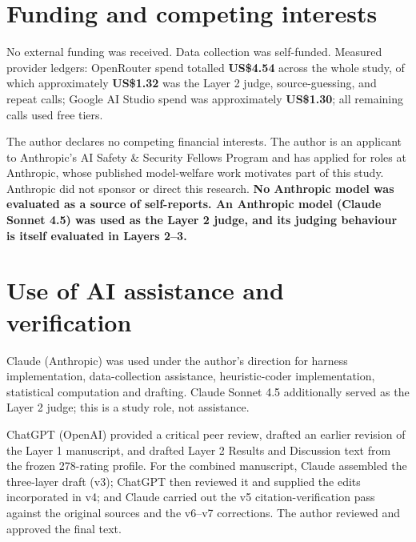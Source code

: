 \documentclass[11pt]{article}
\begin{document}
\hypertarget{funding-and-competing-interests}{%
\section*{Funding and competing interests}\label{funding-and-competing-interests}}

No external funding was received. Data collection was self-funded. Measured provider ledgers: OpenRouter spend totalled \textbf{US\$4.54} across the whole study, of which approximately \textbf{US\$1.32} was the Layer 2 judge, source-guessing, and repeat calls; Google AI Studio spend was approximately \textbf{US\$1.30}; all remaining calls used free tiers.

The author declares no competing financial interests. The author is an applicant to Anthropic's AI Safety \& Security Fellows Program and has applied for roles at Anthropic, whose published model-welfare work motivates part of this study. Anthropic did not sponsor or direct this research. \textbf{No Anthropic model was evaluated as a source of self-reports. An Anthropic model (Claude Sonnet 4.5) was used as the Layer 2 judge, and its judging behaviour is itself evaluated in Layers 2--3.}

\hypertarget{use-of-ai-assistance-and-verification}{%
\section*{Use of AI assistance and verification}\label{use-of-ai-assistance-and-verification}}

Claude (Anthropic) was used under the author's direction for harness implementation, data-collection assistance, heuristic-coder implementation, statistical computation and drafting. Claude Sonnet 4.5 additionally served as the Layer 2 judge; this is a study role, not assistance.

ChatGPT (OpenAI) provided a critical peer review, drafted an earlier revision of the Layer 1 manuscript, and drafted Layer 2 Results and Discussion text from the frozen 278-rating profile. For the combined manuscript, Claude assembled the three-layer draft (v3); ChatGPT then reviewed it and supplied the edits incorporated in v4; and Claude carried out the v5 citation-verification pass against the original sources and the v6--v7 corrections. The author reviewed and approved the final text.
\end{document}
